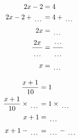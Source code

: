 \documentclass[12pt]{article}
\newcounter{minipagecount}
\begin{document}
\begin{multicols}{2}
\begin{minipage}[t]{0.45\textwidth}
    \raggedright %
    \begin{align*} %
        2x - 2 &= 4\\
        2x - 2 + \dotuline{\hspace{5mm}} &= 4 + \dotuline{\hspace{5mm}}\\
        2x &= \dotuline{\hspace{5mm}}\\
        \frac{2x}{\dotuline{\hspace{5mm}}} &= \frac{\dotuline{\hspace{5mm}}}{\dotuline{\hspace{5mm}}}\\
        x &= \dotuline{\hspace{5mm}}\\
    \end{align*}
\end{minipage} %
\noindent{(\theminipagecount)}\hspace{0.1mm} %
\begin{minipage}[t]{0.45\textwidth} %
    \vspace{-26pt}  %
    \raggedright %
    \begin{align*} %
        \frac{x + 1}{10} &= 1\\
        \frac{x + 1}{10} \times\dotuline{\hspace{5mm}} &= 1 \times\dotuline{\hspace{5mm}}\\
        x + 1 &= \dotuline{\hspace{5mm}}\\
        x + 1 - \dotuline{\hspace{5mm}} &= \dotuline{\hspace{5mm}} - \dotuline{\hspace{5mm}}\\

\end{align*}
\end{minipage}
\end{multicols}
\end{document}
